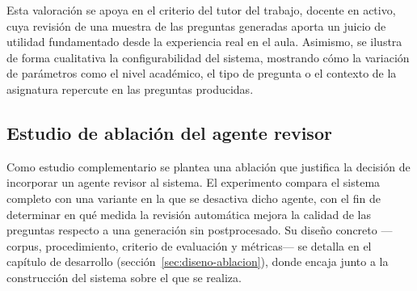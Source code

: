 Esta valoración se apoya en el criterio del tutor del trabajo, docente
en activo, cuya revisión de una muestra de las preguntas generadas
aporta un juicio de utilidad fundamentado desde la experiencia real en
el aula. Asimismo, se ilustra de forma cualitativa la
configurabilidad del sistema, mostrando cómo la variación de parámetros
como el nivel académico, el tipo de pregunta o el contexto de la
asignatura repercute en las preguntas producidas.

\subsection{Estudio de ablación del agente revisor}
\label{sec:ablacion}

Como estudio complementario se plantea una ablación que justifica la
decisión de incorporar un agente revisor al sistema. El experimento
compara el sistema completo con una variante en la que se desactiva
dicho agente, con el fin de determinar en qué medida la revisión
automática mejora la calidad de las preguntas respecto a una generación
sin postprocesado. Su diseño concreto ---corpus, procedimiento, criterio
de evaluación y métricas--- se detalla en el capítulo de desarrollo
(sección~\ref{sec:diseno-ablacion}), donde encaja junto a la construcción
del sistema sobre el que se realiza.